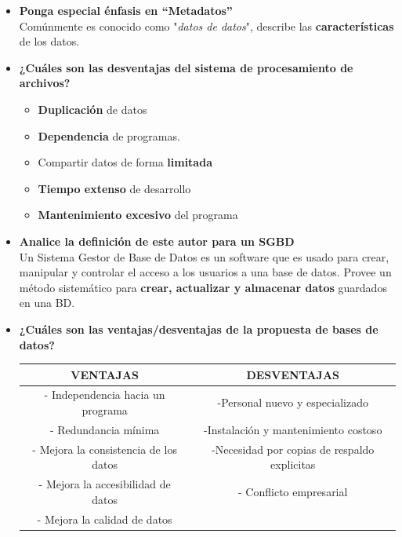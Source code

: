 \documentclass[letterpaper,12pt]{article}
\begin{document}
\begin{sloppypar}
\begin{itemize}
\begin{itemize}
        \item \textbf{Ponga especial énfasis en “Metadatos”} \\ Comúnmente es conocido como "\textit{datos de datos}", describe las \textbf{características} de los datos. 
        \item \textbf{¿Cuáles son las desventajas del sistema de procesamiento de archivos?}
        \begin{itemize}
            \item \textbf{Duplicación} de datos
            \item \textbf{Dependencia} de programas.
            \item Compartir datos de forma \textbf{limitada}
            \item \textbf{Tiempo extenso} de desarrollo
            \item \textbf{Mantenimiento excesivo} del programa
        \end{itemize}
        \item \textbf{Analice la definición de este autor para un SGBD} \\ Un Sistema Gestor de Base de Datos es un software que es usado para crear, manipular y controlar el acceso a los usuarios a una base de datos. Provee un método sistemático para \textbf{crear, actualizar y almacenar datos} guardados en una BD.
        \item \textbf{¿Cuáles son las ventajas/desventajas de la propuesta de bases de datos?}
        \begin{center}
            \begin{tabular}[H]{|c|c|} \hline
            \textbf{VENTAJAS} & \textbf{DESVENTAJAS} \\ \hline
            - Independencia hacia un programa & -Personal nuevo y especializado\\ \hline 
            - Redundancia mínima & -Instalación y mantenimiento costoso\\ \hline
            - Mejora la consistencia de los datos & -Necesidad por copias de respaldo explicitas \\ \hline
            - Mejora la accesibilidad de datos & - Conflicto empresarial \\ \hline
            - Mejora la calidad de datos & \\ \hline
                
            \end{tabular}
        \end{center}


\end{itemize}
\end{itemize}
\end{sloppypar}
\end{document}
